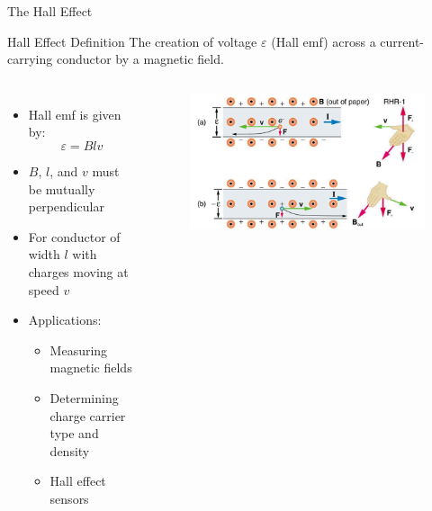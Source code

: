 \documentclass{beamer}
\begin{document}
\begin{frame}{The Hall Effect}
\begin{block}{Hall Effect Definition}
The creation of voltage $\varepsilon$ (Hall emf) across a current-carrying conductor by a magnetic field.
\end{block}

\begin{columns}
\begin{itemize}
\item Hall emf is given by:
\begin{equation}
\varepsilon = Blv
\end{equation}
\item $B$, $l$, and $v$ must be mutually perpendicular
\item For conductor of width $l$ with charges moving at speed $v$
\item Applications:
  \begin{itemize}
  \item Measuring magnetic fields
  \item Determining charge carrier type and density
  \item Hall effect sensors
  \end{itemize}
\end{itemize}

\begin{figure}
    \centering
    \includegraphics[width=1\linewidth]{halleffct.png}
\end{figure}
\end{columns}
\end{frame}
\end{document}
